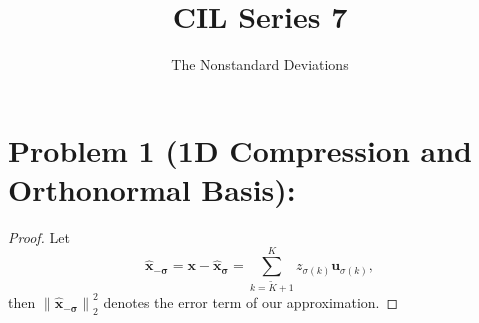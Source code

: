 \documentclass{scrartcl}
\title{CIL Series 7}
\author{The Nonstandard Deviations}
\newcommand{\norm}[1]{\left\lVert#1\right\rVert}
\begin{document}
  \maketitle

  \section{Problem 1 (1D Compression and Orthonormal Basis):} %
  \label{sec:problem_1_1d_compression_and_orthonormal_basis_}
    \begin{proof}
      Let
      \[
        \mathbf{\hat{x}_{-\sigma}} = \mathbf{x} - \mathbf{\hat{x}_\sigma} =
        \sum_{k = \tilde{K} + 1}^K z_{\sigma(k)} \mathbf{u}_{\sigma(k)},
      \]
      then $\norm{\mathbf{\hat{x}_{-\sigma}}}_2^2$ denotes the error term of our
      approximation.


\end{proof}
\end{document}
